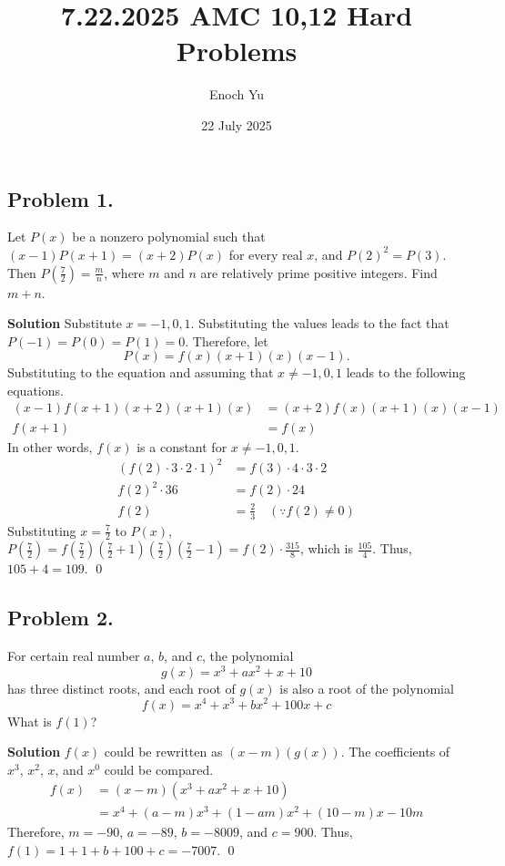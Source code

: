 \documentclass{article}
\title{7.22.2025 AMC 10,12 Hard Problems}
\author{Enoch Yu}
\date{22 July 2025}
\newenvironment{solution}{\begin{trivlist}\item[]{\bf Solution}}{\qed \end{trivlist}}
\begin{document}
\subsection*{Problem 1.}
{\color {BrickRed}
Let $P(x)$ be a nonzero polynomial such that
$(x - 1)P(x + 1) = (x + 2)P(x)$ for every real $x$,
and $P(2)^2 = P(3)$. Then $P \left( \frac{7}{2} \right)
= \frac{m}{n}$, where $m$ and $n$ are relatively prime
positive integers. Find $m + n$.
}

\begin{solution}
Substitute $x = -1, 0, 1$. Substituting the values
leads to the fact that $P(-1) = P(0) = P(1) = 0$.
Therefore, let
\[
P(x) = f(x) (x + 1) (x) (x - 1).
\]
Substituting to the equation and assuming that
$x \neq -1, 0, 1$ leads to the following equations.
\begin{align*}
    (x - 1) f(x + 1) (x + 2) (x + 1) (x)
    &= (x + 2) f(x) (x + 1) (x) (x - 1) \\
    f(x + 1) &= f(x)
\end{align*}
In other words, $f(x)$ is a constant for $x \neq -1, 0, 1$.
\begin{align*}
    \left( f(2) \cdot 3 \cdot 2 \cdot 1 \right)^2
    &= f(3) \cdot 4 \cdot 3 \cdot 2 \\
    f(2)^2 \cdot 36 &= f(2) \cdot 24 \\
    f(2) &= \frac{2}{3} \quad (\because f(2) \neq 0) 
\end{align*}
Substituting $x = \frac{7}{2}$ to $P(x)$,
$P \left( \frac{7}{2} \right)
= f\left( \frac{7}{2} \right)
    \left( \frac{7}{2} + 1 \right)
    \left( \frac{7}{2} \right)
    \left( \frac{7}{2} - 1 \right)
= f(2) \cdot \frac{315}{8}$, which is $\frac{105}{4}$.
Thus, $105 + 4 = \boxed{109}$.
\end{solution}

\subsection*{Problem 2.}
{\color {BrickRed}
For certain real number $a$, $b$, and $c$, the polynomial
\[
g(x) = x^3 + ax^2 + x + 10
\]
has three distinct roots, and each root of $g(x)$ is also
a root of the polynomial
\[
f(x) = x^4 + x^3 + bx^2 + 100x + c
\]
What is $f(1)$?
}

\begin{solution}
$f(x)$ could be rewritten as $(x - m)(g(x))$.
The coefficients of $x^3$, $x^2$, $x$, and $x^0$
could be compared.
\begin{align*}
    f(x)
    &= (x - m)(x^3 + ax^2 + x + 10) \\
    &= x^4 + (a - m)x^3 + (1 - am)x^2 + (10 - m)x - 10m
\end{align*}
Therefore, $m = -90$, $a = -89$, $b = -8009$, and
$c = 900$. Thus, $f(1) = 1 + 1 + b + 100 + c = \boxed{-7007}$.
\end{solution}
\end{document}
